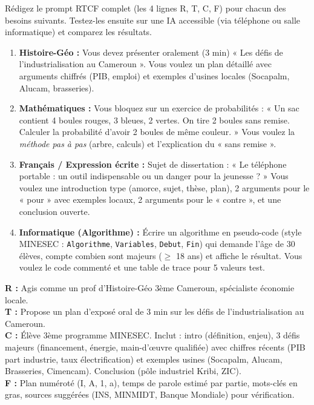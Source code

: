 \documentclass[11pt]{article}
\newcounter{popsec}
\newcounter{popsub}
\newcommand{\courssub}[1]{%
  \stepcounter{popsub}%
  \par\vspace{9pt}\noindent{\popxbold\fontsize{11.5}{13}\selectfont\color{popink}{\color{poporange}\thepopsec.\thepopsub}\hspace{6pt}#1}\par\nopagebreak\vspace{4pt}
}
\begin{document}
\courssub{Exercices d'entraînement}

\begin{exercice}
Rédigez le prompt RTCF complet (les 4 lignes R, T, C, F) pour chacun des besoins suivants. Testez-les ensuite sur une IA accessible (via téléphone ou salle informatique) et comparez les résultats.

\begin{enumerate}
    \item \textbf{Histoire-Géo :} Vous devez présenter oralement (3 min) « Les défis de l'industrialisation au Cameroun ». Vous voulez un plan détaillé avec arguments chiffrés (PIB, emploi) et exemples d'usines locales (Socapalm, Alucam, brasseries).
    \item \textbf{Mathématiques :} Vous bloquez sur un exercice de probabilités : « Un sac contient 4 boules rouges, 3 bleues, 2 vertes. On tire 2 boules sans remise. Calculer la probabilité d'avoir 2 boules de même couleur. » Vous voulez la \emph{méthode pas à pas} (arbre, calculs) et l'explication du « sans remise ».
    \item \textbf{Français / Expression écrite :} Sujet de dissertation : « Le téléphone portable : un outil indispensable ou un danger pour la jeunesse ? » Vous voulez une introduction type (amorce, sujet, thèse, plan), 2 arguments pour le « pour » avec exemples locaux, 2 arguments pour le « contre », et une conclusion ouverte.
    \item \textbf{Informatique (Algorithme) :} Écrire un algorithme en pseudo-code (style MINESEC : \texttt{Algorithme}, \texttt{Variables}, \texttt{Debut}, \texttt{Fin}) qui demande l'âge de 30 élèves, compte combien sont majeurs ($\ge$ 18 ans) et affiche le résultat. Vous voulez le code commenté et une table de trace pour 5 valeurs test.
\end{enumerate}
\end{exercice}

\begin{corrige}
\textbf{R :} Agis comme un prof d'Histoire-Géo 3ème Cameroun, spécialiste économie locale. \\
\textbf{T :} Propose un plan d'exposé oral de 3 min sur les défis de l'industrialisation au Cameroun. \\
\textbf{C :} Élève 3ème programme MINESEC. Inclut : intro (définition, enjeu), 3 défis majeurs (financement, énergie, main-d'œuvre qualifiée) avec chiffres récents (PIB part industrie, taux électrification) et exemples usines (Socapalm, Alucam, Brasseries, Cimencam). Conclusion (pôle industriel Kribi, ZIC). \\
\textbf{F :} Plan numéroté (I, A, 1, a), temps de parole estimé par partie, mots-clés en gras, sources suggérées (INS, MINMIDT, Banque Mondiale) pour vérification.
\end{corrige}
\end{document}
